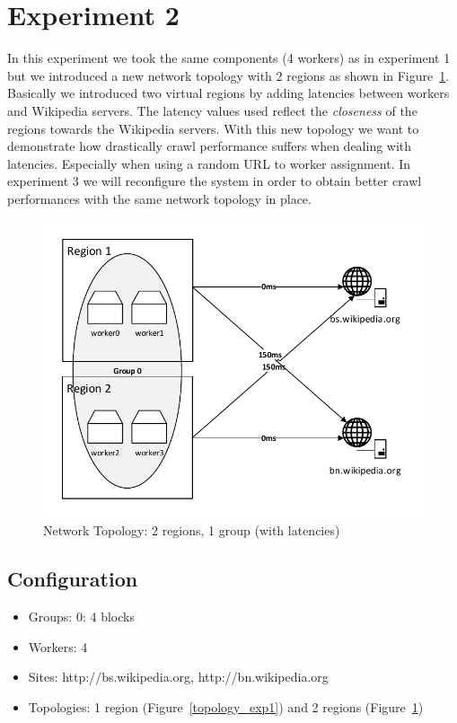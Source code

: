 \section{Experiment 2}

In this experiment we took the same components (4 workers) as in experiment 1 but we introduced a new network topology with 2 regions as shown in Figure~\ref{topology_exp2}. Basically we introduced two virtual regions by adding latencies between workers and Wikipedia servers. The latency values used reflect the \emph{closeness} of the regions towards the Wikipedia servers. With this new topology we want to demonstrate how drastically crawl performance suffers when dealing with latencies. Especially when using a random URL to worker assignment. In experiment 3 we will reconfigure the system in order to obtain better crawl performances with the same network topology in place.

\begin{figure}[h]
\centering
  \includegraphics[width=1.0\textwidth]{Figures/topology_exp2.pdf}
  \caption{Network Topology: 2 regions, 1 group (with latencies)}
\label{topology_exp2}
\end{figure}

\subsection{Configuration}
\begin{itemize}
  \item Groups: 0: 4 blocks
  \item Workers: 4
  \item Sites: http://bs.wikipedia.org, http://bn.wikipedia.org
  \item Topologies: 1 region (Figure~\ref{topology_exp1}) and 2 regions (Figure~\ref{topology_exp2})
\end{itemize}

